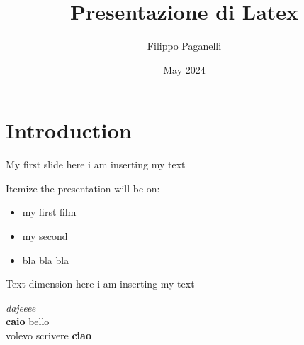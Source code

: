 \documentclass{beamer} %
\title{Presentazione di Latex}
\author{Filippo Paganelli} %
\date{May 2024}
\begin{document}
\maketitle


\section{Introduction}

\begin{frame}{My first slide} %
    here i am inserting my text
\end{frame}

\begin{frame}{Itemize}
the presentation will be on:
    \begin{itemize} %
        \item my first film
        \item \pause my second %
        \item \pause bla bla bla
    \end{itemize}
\end{frame}

\begin{frame}{Text dimension} %
    \scriptsize{here i am inserting my text}
\end{frame}

\begin{frame}{4} 
    \textit{dajeeee}\\ %
    \textbf{caio} bello\\
    \bigskip %
    volevo scrivere \textbf{ciao} %
\end{frame}
\end{document}
